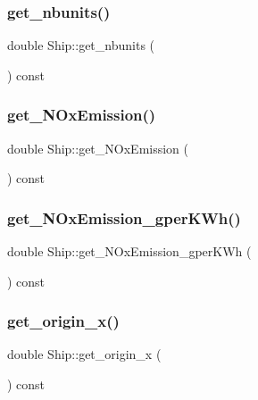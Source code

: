 \mbox{\label{class_ship_a6b424d1428e06721e0496fff8b5583fc}} 
\subsubsection{\texorpdfstring{get\_nbunits()}{get\_nbunits()}}
{\footnotesize\ttfamily double Ship\+::get\+\_\+nbunits (\begin{DoxyParamCaption}{ }\end{DoxyParamCaption}) const}

\mbox{\label{class_ship_aed6705dc37c07d1ca009ba2b9ca4a150}} 
\subsubsection{\texorpdfstring{get\_NOxEmission()}{get\_NOxEmission()}}
{\footnotesize\ttfamily double Ship\+::get\+\_\+\+N\+Ox\+Emission (\begin{DoxyParamCaption}{ }\end{DoxyParamCaption}) const}

\mbox{\label{class_ship_a96eb0a840c25f7ccd567437990acf2a3}} 
\subsubsection{\texorpdfstring{get\_NOxEmission\_gperKWh()}{get\_NOxEmission\_gperKWh()}}
{\footnotesize\ttfamily double Ship\+::get\+\_\+\+N\+Ox\+Emission\+\_\+gper\+K\+Wh (\begin{DoxyParamCaption}{ }\end{DoxyParamCaption}) const}

\mbox{\label{class_ship_a8a27995643103791ae161daff47b2e68}} 
\subsubsection{\texorpdfstring{get\_origin\_x()}{get\_origin\_x()}}
{\footnotesize\ttfamily double Ship\+::get\+\_\+origin\+\_\+x (\begin{DoxyParamCaption}{ }\end{DoxyParamCaption}) const}

